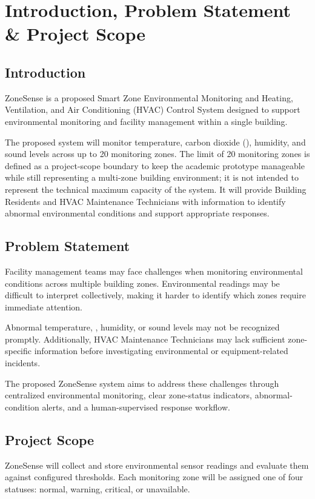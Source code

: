 \documentclass[11pt,a4paper]{article}
\begin{document}
\makecover

\section{Introduction, Problem Statement \& Project Scope}

\subsection{Introduction}
ZoneSense is a proposed Smart Zone Environmental Monitoring and Heating, Ventilation, and Air Conditioning (HVAC) Control System designed to support environmental monitoring and facility management within a single building.

The proposed system will monitor temperature, carbon dioxide (\COtwo), humidity, and sound levels across up to 20 monitoring zones. The limit of 20 monitoring zones is defined as a project-scope boundary to keep the academic prototype manageable while still representing a multi-zone building environment; it is not intended to represent the technical maximum capacity of the system. It will provide Building Residents and HVAC Maintenance Technicians with information to identify abnormal environmental conditions and support appropriate responses.

\subsection{Problem Statement}
Facility management teams may face challenges when monitoring environmental conditions across multiple building zones. Environmental readings may be difficult to interpret collectively, making it harder to identify which zones require immediate attention.

Abnormal temperature, \COtwo, humidity, or sound levels may not be recognized promptly. Additionally, HVAC Maintenance Technicians may lack sufficient zone-specific information before investigating environmental or equipment-related incidents.

The proposed ZoneSense system aims to address these challenges through centralized environmental monitoring, clear zone-status indicators, abnormal-condition alerts, and a human-supervised response workflow.

\subsection{Project Scope}
ZoneSense will collect and store environmental sensor readings and evaluate them against configured thresholds. Each monitoring zone will be assigned one of four statuses: normal, warning, critical, or unavailable.
\end{document}
